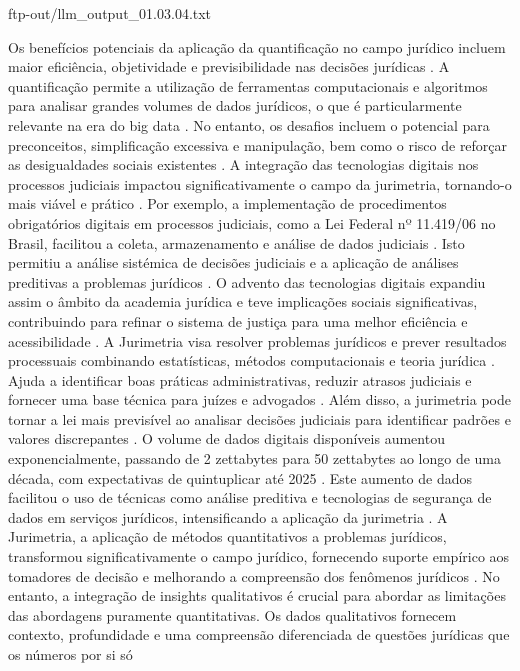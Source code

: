 ftp-out/llm_output_01.03.04.txt 

Os benefícios potenciais da aplicação da quantificação no campo jurídico incluem maior eficiência, objetividade e previsibilidade nas decisões jurídicas \cite{silva2023role,nunes2016jurimetria}. A quantificação permite a utilização de ferramentas computacionais e algoritmos para analisar grandes volumes de dados jurídicos, o que é particularmente relevante na era do big data \cite{silva2023role,nunes2016jurimetria}. No entanto, os desafios incluem o potencial para preconceitos, simplificação excessiva e manipulação, bem como o risco de reforçar as desigualdades sociais existentes \cite{silva2023role,nunes2016jurimetria}. A integração das tecnologias digitais nos processos judiciais impactou significativamente o campo da jurimetria, tornando-o mais viável e prático \cite{silva2023role,103390fi9040068}. Por exemplo, a implementação de procedimentos obrigatórios digitais em processos judiciais, como a Lei Federal nº 11.419/06 no Brasil, facilitou a coleta, armazenamento e análise de dados judiciais \cite{103390fi9040068}. Isto permitiu a análise sistémica de decisões judiciais e a aplicação de análises preditivas a problemas jurídicos \cite{silva2023role,103390fi9040068}. O advento das tecnologias digitais expandiu assim o âmbito da academia jurídica e teve implicações sociais significativas, contribuindo para refinar o sistema de justiça para uma melhor eficiência e acessibilidade \cite{1023071190721,10.3390/fi9040068,10.1080/07329113.2015.1046739,10.5040/9781350220645,de20 10jurimetria ,zabala2019décadas,10.1057/s41599-020-00557-0,na leiviewmetadadoscitaçãosimilarpapers2014,10.1590/dados.2022.65.3.267,10.2307/2654208,demortain2019politics,10.1057/s41599-02 0-0396-5,10.1007/s11186-021-09453-1 ,comptabilitat0018,salais2016quantificação,10.1017/s0003975609000150,supiot2018,nunes201}. A Jurimetria visa resolver problemas jurídicos e prever resultados processuais combinando estatísticas, métodos computacionais e teoria jurídica \cite{silva2023role}. Ajuda a identificar boas práticas administrativas, reduzir atrasos judiciais e fornecer uma base técnica para juízes e advogados \cite{silva2023role}. Além disso, a jurimetria pode tornar a lei mais previsível ao analisar decisões judiciais para identificar padrões e valores discrepantes \cite{103390fi9040068}. O volume de dados digitais disponíveis aumentou exponencialmente, passando de 2 zettabytes para 50 zettabytes ao longo de uma década, com expectativas de quintuplicar até 2025 \cite{silva2023role}. Este aumento de dados facilitou o uso de técnicas como análise preditiva e tecnologias de segurança de dados em serviços jurídicos, intensificando a aplicação da jurimetria \cite{silva2023role}. A Jurimetria, a aplicação de métodos quantitativos a problemas jurídicos, transformou significativamente o campo jurídico, fornecendo suporte empírico aos tomadores de decisão e melhorando a compreensão dos fenômenos jurídicos \cite{10.3390/fi9040068,10.5040/9781350220645,de2010jurimetrics}. No entanto, a integração de insights qualitativos é crucial para abordar as limitações das abordagens puramente quantitativas. Os dados qualitativos fornecem contexto, profundidade e uma compreensão diferenciada de questões jurídicas que os números por si só 